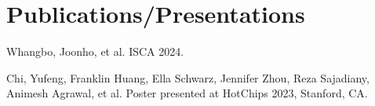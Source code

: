 \documentclass[]{deedy-resume-openfont}
\begin{document}
\begin{minipage}[t]{0.64\textwidth}
\section{Publications/Presentations}
\vspace{\topsep}
\begin{tightemize}
\item Whangbo, Joonho, et al.  ISCA 2024.
\item Chi, Yufeng, Franklin Huang, Ella Schwarz, Jennifer Zhou, Reza Sajadiany, Animesh Agrawal, et al. \href{https://hc2023.hotchips.org/assets/program/posters/HC2023.UCBerkeley.YufengChi.Poster.v06.pdf} {} Poster presented at HotChips 2023, Stanford, CA.
\end{tightemize}
\end{minipage} 
\end{document}
